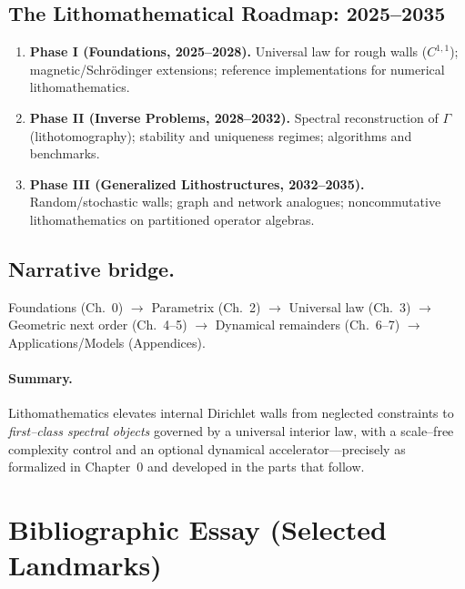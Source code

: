 \subsection{The Lithomathematical Roadmap: 2025–2035}\label{subsec:roadmap}
\begin{enumerate}
  \item \textbf{Phase I (Foundations, 2025–2028).} Universal law for rough walls ($C^{1,1}$); magnetic/Schr\"odinger extensions; reference implementations for numerical lithomathematics.
  \item \textbf{Phase II (Inverse Problems, 2028–2032).} Spectral reconstruction of $\Gamma$ (lithotomography); stability and uniqueness regimes; algorithms and benchmarks.
  \item \textbf{Phase III (Generalized Lithostructures, 2032–2035).} Random/stochastic walls; graph and network analogues; noncommutative lithomathematics on partitioned operator algebras.
\end{enumerate}

\subsection{Narrative bridge.}\label{subsec:narrative}
Foundations (Ch.~0) $\to$ Parametrix (Ch.~2) $\to$ Universal law (Ch.~3) $\to$ Geometric next order (Ch.~4–5) $\to$ Dynamical remainders (Ch.~6–7) $\to$ Applications/Models (Appendices).

\paragraph{Summary.}
Lithomathematics elevates internal Dirichlet walls from neglected constraints to \emph{first–class spectral objects} governed by a universal interior law, with a scale–free complexity control and an optional dynamical accelerator—precisely as formalized in Chapter~0 and developed in the parts that follow.



\section{Bibliographic Essay (Selected Landmarks)}\label{sec:biblio-essay}

